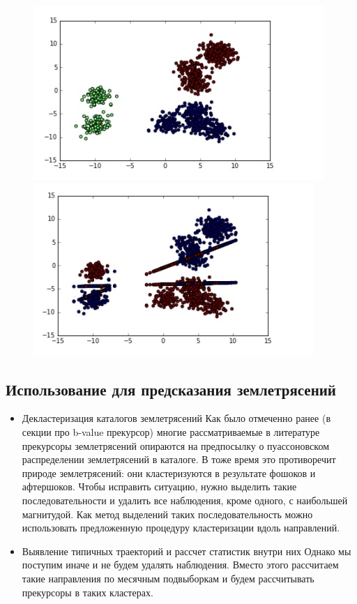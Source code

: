 \begin{figure}[H]
    \centering
    \includegraphics[scale=0.35]{figures/gaussian_mixture.jpg}
    \includegraphics[scale=0.35]{figures/linear_regression_mixture.jpg}
   \end{figure}

\subsection{Использование для предсказания землетрясений}
\begin{itemize}

\item Декластеризация каталогов землетрясений
Как было отмеченно ранее (в секции про b-value прекурсор) многие рассматриваемые в литературе прекурсоры землетрясений опираются на предпосылку о пуассоновском распределении землетрясений в каталоге. В тоже время это противоречит природе землетрясений: они кластеризуются в результате фошоков и афтершоков.  Чтобы исправить ситуацию, нужно выделить такие последовательности и удалить все наблюдения, кроме одного, с наибольшей магнитудой. Как метод выделений таких последовательность можно использовать предложенную процедуру кластеризации вдоль направлений.

\item Выявление типичных траекторий и рассчет статистик внутри них
Однако мы поступим иначе и не будем удалять наблюдения. Вместо этого рассчитаем такие направления по месячным подвыборкам и будем рассчитывать прекурсоры в таких кластерах. 
\end{itemize}

